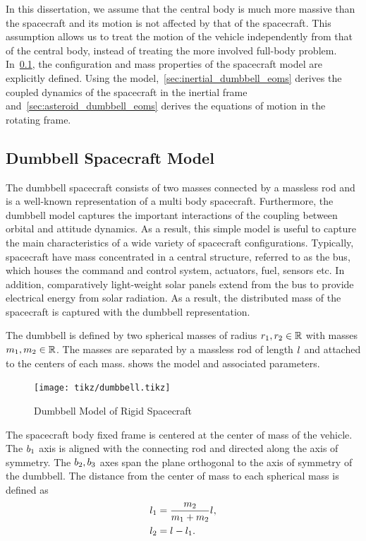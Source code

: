 In this dissertation, we assume that the central body is much more massive than the spacecraft and its motion is not affected by that of the spacecraft.
This assumption allows us to treat the motion of the vehicle independently from that of the central body, instead of treating the more involved full-body problem. 
In~\cref{sec:dumbbell_model}, the configuration and mass properties of the spacecraft model are explicitly defined.
Using the model,~\cref{sec:inertial_dumbbell_eoms} derives the coupled dynamics of the spacecraft in the inertial frame and~\cref{sec:asteroid_dumbbell_eoms} derives the equations of motion in the rotating frame.

\subsection{Dumbbell Spacecraft Model}\label{sec:dumbbell_model}

The dumbbell spacecraft consists of two masses connected by a massless rod and is a well-known representation of a multi body spacecraft.
Furthermore, the dumbbell model captures the important interactions of the coupling between orbital and attitude dynamics. 
As a result, this simple model is useful to capture the main characteristics of a wide variety of spacecraft configurations.
Typically, spacecraft have mass concentrated in a central structure, referred to as the bus, which houses the command and control system, actuators, fuel, sensors etc. 
In addition, comparatively light-weight solar panels extend from the bus to provide electrical energy from solar radiation. 
As a result, the distributed mass of the spacecraft is captured with the dumbbell representation.

The dumbbell is defined by two spherical masses of radius \( r_{1}, r_{2} \in \mathbb{R} \) with masses \( m_{1}, m_{2} \in  \mathbb{R}\).
The masses are separated by a massless rod of length \( l_{} \) and attached to the centers of each mass.
 shows the model and associated parameters.
\begin{figure}[htbp]
    \centering
    \texttt{[image: tikz/dumbbell.tikz]}
    \caption{Dumbbell Model of Rigid Spacecraft\label{fig:dumbbell_sc}}
\end{figure}
The spacecraft body fixed frame is centered at the center of mass of the vehicle.
The \( b_{1} \)  axis is aligned with the connecting rod and directed along the axis of symmetry.
The \( b_{2}, b_{3} \) axes span the plane orthogonal to the axis of symmetry of the dumbbell.
The distance from the center of mass to each spherical mass is defined as
\begin{align}\label{eq:dumbbell_mass_distances}
    l_{1} &= \frac{m_{2}}{m_{1} + m_{2}} l_{}, \\
    l_{2} &= l_{} - l_{1}.
\end{align}

